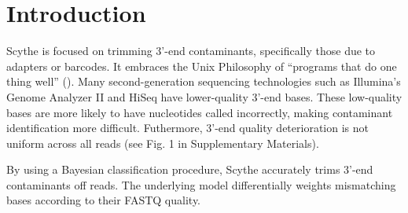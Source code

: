 \documentclass{bioinfo}
\begin{document}
\section{Introduction}
Scythe is focused on trimming 3'-end contaminants, specifically those
due to adapters or barcodes. It embraces the Unix Philosophy of
``programs that do one thing well'' (\citealp{raymond2003}). Many
second-generation sequencing technologies such as Illumina's Genome
Analyzer II and HiSeq have lower-quality 3'-end bases. These
low-quality bases are more likely to have nucleotides called
incorrectly, making contaminant identification more
difficult. Futhermore, 3'-end quality deterioration is not uniform
across all reads (see Fig. 1 in Supplementary Materials).

By using a Bayesian classification procedure, Scythe accurately trims
3'-end contaminants off reads. The underlying model differentially
weights mismatching bases according to their FASTQ quality.


\end{document}
